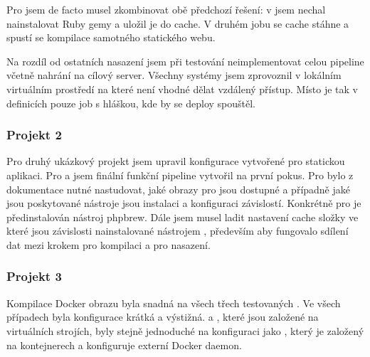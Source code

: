             Pro \semaphore jsem de facto musel zkombinovat obě předchozí řešení: v  jsem nechal nainstalovat Ruby gemy a uložil je do cache. V druhém jobu se cache stáhne a spustí se kompilace samotného statického webu.

            Na rozdíl od ostatních nasazení jsem při testování  neimplementovat celou \CI pipeline včetně nahrání na cílový server. Všechny systémy jsem zprovoznil v lokálním virtuálním prostředí na které není vhodné dělat vzdálený přístup. Místo  je tak v definicích pouze job s hláškou, kde by se deploy spouštěl.

        \subsubsection{Projekt 2}
            Pro druhý ukázkový projekt jsem upravil konfigurace vytvořené pro statickou aplikaci. Pro \circleci a \travis jsem finální funkční pipeline vytvořil na první pokus. Pro \semaphore bylo z dokumentace nutné nastudovat, jaké obrazy pro  jsou dostupné a případně jaké jsou poskytované nástroje jsou instalaci a konfiguraci závislostí. Konkrétně pro  je předinstalován nástroj phpbrew. Dále jsem musel ladit nastavení cache složky  ve které jsou závislosti nainstalované nástrojem , především aby fungovalo sdílení dat mezi krokem pro kompilaci a pro nasazení.

        \subsubsection{Projekt 3}
            Kompilace Docker obrazu byla snadná na všech třech testovaných  \CI. Ve všech případech byla konfigurace krátká a výstižná. \travis a \semaphore, které jsou založené na virtuálních strojích, byly stejně jednoduché na konfiguraci jako \circleci, který je založený na kontejnerech a konfiguruje externí Docker daemon.
